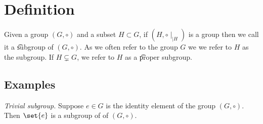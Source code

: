 
\section*{Definition}

Given a group $(G, \circ)$ and a subset $H \subset G$, if $(H, \circ\mid _{\mid H})$ is a group then we call it a \t{subgroup} of $(G, \circ)$.
As we often refer to the group $G$ we we refer to $H$ as the subgroup.
If $H \subsetneq G$, we refer to $H$ as a \t{proper subgroup}.

\subsection*{Examples}

\textit{Trivial subgroup.}
Suppose $e \in G$ is the identity element of the group $(G, \circ)$.
Then $\set{e}$ is a subgroup of of $(G, \circ)$.

\blankpage